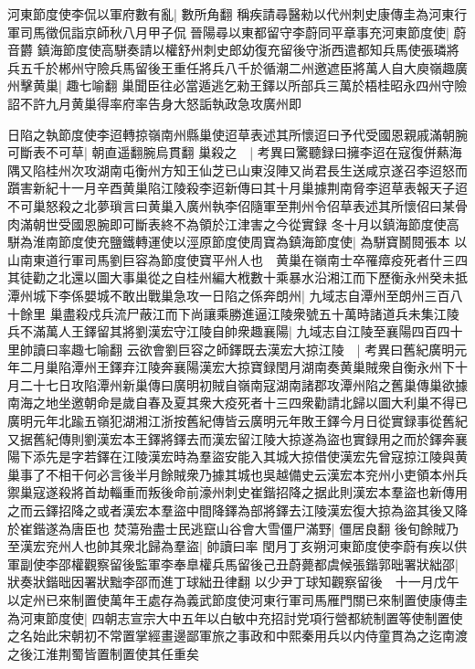 河東節度使李侃以軍府數有亂|{
	數所角翻}
稱疾請尋醫勑以代州刺史康傳圭為河東行軍司馬徵侃詣京師秋八月甲子侃晉陽尋以東都留守李蔚同平章事充河東節度使|{
	蔚音欝}
鎮海節度使高駢奏請以權舒州刺史郎幼復充留後守浙西遣都知兵馬使張璘將兵五千於郴州守險兵馬留後王重任將兵八千於循潮二州邀遮臣將萬人自大庾嶺趣廣州擊黄巢|{
	趣七喻翻}
巢聞臣往必當遁逃乞勑王鐸以所部兵三萬於梧桂昭永四州守險詔不許九月黄巢得率府率告身大怒詬執政急攻廣州即

日陷之執節度使李迢轉掠嶺南州縣巢使迢草表述其所懷迢曰予代受國恩親戚滿朝腕可斷表不可草|{
	朝直遥翻腕烏貫翻}
巢殺之　|{
	考異曰驚聽録曰擁李迢在寇復併爇海隅又陷桂州次攻湖南屯衡州方知王仙芝已山東沒陣又尚君長生送咸京遂召李迢怒而躓害新紀十一月辛酉黄巢陷江陵殺李迢新傳曰其十月巢據荆南脅李迢草表報天子迢不可巢怒殺之北夢瑣言曰黄巢入廣州執李佋隨軍至荆州令佋草表述其所懷佋曰某骨肉滿朝世受國恩腕即可斷表終不為領於江津害之今從實録}
冬十月以鎮海節度使高駢為淮南節度使充鹽鐵轉運使以涇原節度使周寶為鎮海節度使|{
	為駢寶鬭䦧張本}
以山南東道行軍司馬劉巨容為節度使寶平州人也　黄巢在嶺南士卒罹瘴疫死者什三四其徒勸之北還以圖大事巢從之自桂州編大栰數十乘暴水沿湘江而下歷衡永州癸未抵潭州城下李係嬰城不敢出戰巢急攻一日陷之係奔朗州|{
	九域志自潭州至朗州三百八十餘里}
巢盡殺戍兵流尸蔽江而下尚讓乘勝進逼江陵衆號五十萬時諸道兵未集江陵兵不滿萬人王鐸留其將劉漢宏守江陵自帥衆趣襄陽|{
	九域志自江陵至襄陽四百四十里帥讀曰率趣七喻翻}
云欲會劉巨容之師鐸既去漢宏大掠江陵　|{
	考異曰舊紀廣明元年二月巢陷潭州王鐸弃江陵奔襄陽漢宏大掠寶録閏月湖南奏黄巢賊衆自衡永州下十月二十七日攻陷潭州新巢傳曰廣明初賊自嶺南寇湖南諸郡攻潭州陷之舊巢傳巢欲據南海之地坐邀朝命是歲自春及夏其衆大疫死者十三四衆勸請北歸以圖大利巢不得已廣明元年北踰五嶺犯湖湘江浙按舊紀傳皆云廣明元年敗王鐸今月日從實録事從舊紀又据舊紀傳則劉漢宏本王鐸將鐸去而漢宏留江陵大掠遂為盜也實録用之而於鐸奔襄陽下添先是字若鐸在江陵漢宏時為羣盜安能入其城大掠借使漢宏先曾寇掠江陵與黄巢事了不相干何必言後半月餘賊衆乃據其城也吳越備史云漢宏本兖州小吏領本州兵禦巢寇遂殺將首劫輜重而叛後命前濠州刺史崔鍇招降之据此則漢宏本羣盜也新傳用之而云鐸招降之或者漢宏本羣盜中間降鐸為部將鐸去江陵漢宏復大掠為盜其後又降於崔鍇遂為唐臣也}
焚蕩殆盡士民逃竄山谷會大雪僵尸滿野|{
	僵居良翻}
後旬餘賊乃至漢宏兖州人也帥其衆北歸為羣盜|{
	帥讀曰率}
閏月丁亥朔河東節度使李蔚有疾以供軍副使李邵權觀察留後監軍李奉臯權兵馬留後己丑蔚薨都虞候張鍇郭昢署狀絀邵|{
	狀奏狀鍇昢因署狀黜李邵而進丁球絀丑律翻}
以少尹丁球知觀察留後　十一月戊午以定州已來制置使萬年王處存為義武節度使河東行軍司馬雁門關已來制置使康傳圭為河東節度使|{
	四朝志宣宗大中五年以白敏中充招討党項行營都統制置等使制置使之名始此宋朝初不常置掌經畫邊鄙軍旅之事政和中熙秦用兵以内侍童貫為之迄南渡之後江淮荆蜀皆置制置使其任重矣}
